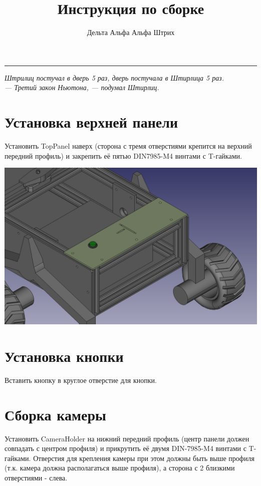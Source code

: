 \documentclass[12pt,a4paper,oneside]{article}
\title{\textbf{Инструкция по сборке}}
\author{Дельта Альфа Альфа Штрих}
\date{}
\begin{document}
\maketitle

\noindent\rule{\textwidth}{1pt}

\begin{flushright}
    \textit{Штрилиц постучал в дверь 5 раз, дверь постучала в Штирлица 5 раз.\\
        — Третий закон Ньютона, — подумал Штирлиц.}
\end{flushright}


\section{Установка верхней панели}
Установить TopPanel наверх (сторона с тремя отверстиями крепится на верхний
передний профиль) и закрепить её пятью DIN7985-M4 винтами с T-гайками.

\includegraphics[width=\textwidth]{toppanel}

\section{Установка кнопки}
Вставить кнопку в круглое отверстие для кнопки.

\section{Сборка камеры}
Установить CameraHolder на нижний передний профиль (центр панели должен
совпадать с центром профиля) и прикрутить её двумя DIN-7985-M4 винтами с
T-гайками. Отверстия для крепления камеры при этом должны быть выше профиля
(т.к. камера должна располагаться выше профиля), а сторона с 2 близкими
отверстиями - слева.
\end{document}
